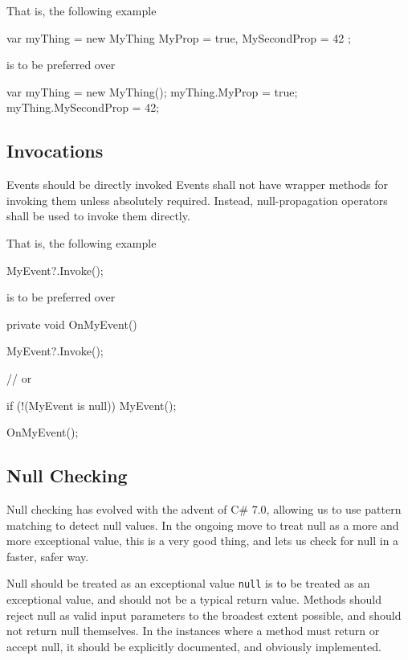 \documentclass[11pt,a4paper]{article}
\begin{document}
That is, the following example 
\begin{code}
var myThing = new MyThing
{
    MyProp = true,
    MySecondProp = 42
};
\end{code}

is to be preferred over

\begin{code}
var myThing = new MyThing();
myThing.MyProp = true;
myThing.MySecondProp = 42;
\end{code}

\subsection{Invocations}
\begin{should}{Events should be directly invoked}
Events shall not have wrapper methods for invoking them unless absolutely required. Instead, null-propagation operators shall be used to invoke them directly.
\end{should}

That is, the following example 
\begin{code}
MyEvent?.Invoke();
\end{code}

is to be preferred over

\begin{code}
private void OnMyEvent()
{
    MyEvent?.Invoke();
    
    // or
    
    if (!(MyEvent is null))
    {
        MyEvent();
    }
}

OnMyEvent();
\end{code}

\subsection{Null Checking}
Null checking has evolved with the advent of C\# 7.0, allowing us to use pattern matching to detect null values. In the ongoing move to treat null as a more and more exceptional value, this is a very good thing, and lets us check for null in a faster, safer way.

\begin{should}{Null should be treated as an exceptional value}
\texttt{null} is to be treated as an exceptional value, and should not be a typical return value. Methods should reject null as valid input parameters to the broadest extent possible, and should not return null themselves. In the instances where a method must return or accept null, it should be explicitly documented, and obviously implemented.
\end{should}
\end{document}
